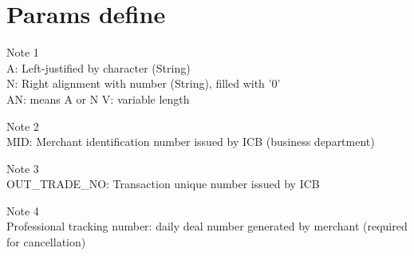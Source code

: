 \documentclass[12pt]{article}
\begin{document}
\section{Params define}\label{previous work}
\begin{description}
    \item Note 1 \\
    A: Left-justified by character (String) \\
    N: Right alignment with number (String), filled with '0' \\
    AN: means A or N V: variable length \\
    \item Note 2 \\
    MID: Merchant identification number issued by ICB (business department) \\
    \item Note 3 \\
    OUT\_TRADE\_NO: Transaction unique number issued by ICB \\
    \item Note 4 \\ 
    Professional tracking number: daily deal number generated by merchant (required for cancellation)\\
\end{description}
\end{document}
